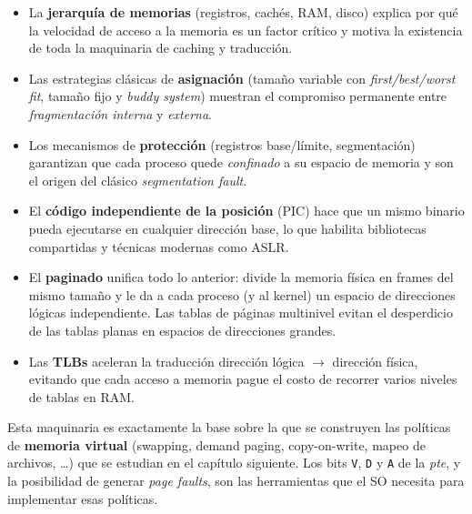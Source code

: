 \documentclass[11pt,a4paper]{article}
\begin{document}
\begin{itemize}[leftmargin=*]
    \item La \textbf{jerarquía de memorias} (registros, cachés, RAM,
        disco) explica por qué la velocidad de acceso a la memoria es
        un factor crítico y motiva la existencia de toda la maquinaria
        de caching y traducción.
    \item Las estrategias clásicas de \textbf{asignación} (tamaño
        variable con \emph{first/best/worst fit}, tamaño fijo y
        \emph{buddy system}) muestran el compromiso permanente entre
        \emph{fragmentación interna} y \emph{externa}.
    \item Los mecanismos de \textbf{protección} (registros base/límite,
        segmentación) garantizan que cada proceso quede
        \emph{confinado} a su espacio de memoria y son el origen del
        clásico \emph{segmentation fault}.
    \item El \textbf{código independiente de la posición} (PIC) hace
        que un mismo binario pueda ejecutarse en cualquier dirección
        base, lo que habilita bibliotecas compartidas y técnicas
        modernas como ASLR.
    \item El \textbf{paginado} unifica todo lo anterior: divide la
        memoria física en frames del mismo tamaño y le da a cada
        proceso (y al kernel) un espacio de direcciones lógicas
        independiente. Las tablas de páginas multinivel evitan el
        desperdicio de las tablas planas en espacios de direcciones
        grandes.
    \item Las \textbf{TLBs} aceleran la traducción dirección
        lógica $\to$ dirección física, evitando que cada acceso a
        memoria pague el costo de recorrer varios niveles de tablas en
        RAM.
\end{itemize}

\begin{idea}
Esta maquinaria es exactamente la base sobre la que se construyen las
políticas de \textbf{memoria virtual} (swapping, demand paging,
copy-on-write, mapeo de archivos, \ldots) que se estudian en el
capítulo siguiente. Los bits \texttt{V}, \texttt{D} y \texttt{A} de la
\emph{pte}, y la posibilidad de generar \emph{page faults}, son las
herramientas que el SO necesita para implementar esas políticas.
\end{idea}
\end{document}
